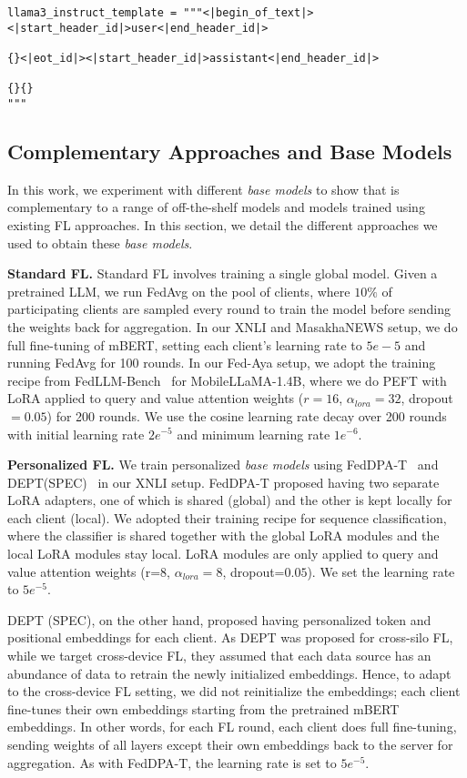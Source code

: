 \begin{lstlisting}[linewidth=\columnwidth,breaklines=true]
llama3_instruct_template = """<|begin_of_text|><|start_header_id|>user<|end_header_id|>

{}<|eot_id|><|start_header_id|>assistant<|end_header_id|>

{}{}
"""
\end{lstlisting}

\subsection{Complementary Approaches and Base Models}

In this work, we experiment with different {\em base models} to show that \method{} is complementary to a range of off-the-shelf models and models trained using existing FL approaches. In this section, we detail the different approaches we used to obtain these {\em base models}.

\noindent\textbf{Standard FL.} Standard FL involves training a single global model. Given a pretrained LLM, we run FedAvg on the \seen{} pool of clients, where $10\%$ of participating clients are sampled every round to train the model before sending the weights back for aggregation. In our XNLI and MasakhaNEWS setup, we do full fine-tuning of mBERT, setting each client's learning rate to $5e-5$ and running FedAvg for 100 rounds. In our Fed-Aya setup, we adopt the training recipe from FedLLM-Bench~\cite{fedllm-bench} for MobileLLaMA-1.4B, where we do PEFT with LoRA applied to query and value attention weights ($r=16$, $\alpha_{lora}=32$, dropout$=0.05$) for 200 rounds. We use the cosine learning rate decay over 200 rounds with initial learning rate $2e^{-5}$ and minimum learning rate $1e^{-6}$.

\noindent\textbf{Personalized FL.} We train personalized {\em base models} using FedDPA-T~\cite{FedDPA} and DEPT(SPEC)~\cite{DEPT} in our XNLI setup. FedDPA-T proposed having two separate LoRA adapters, one of which is shared (global) and the other is kept locally for each client (local). 
We adopted their training recipe for sequence classification, where the classifier is shared together with the global LoRA modules and the local LoRA modules stay local. LoRA modules are only applied to query and value attention weights (r=8, $\alpha_{lora}=8$, dropout=$0.05$). We set the learning rate to $5e^{-5}$.

DEPT (SPEC), on the other hand, proposed having personalized token and positional embeddings for each client. As DEPT was proposed for cross-silo FL, while we target cross-device FL, they assumed that each data source has an abundance of data to retrain the newly initialized embeddings. Hence, to adapt to the cross-device FL setting, we did not reinitialize the embeddings; each client fine-tunes their own embeddings starting from the pretrained mBERT embeddings. In other words, for each FL round, each client does full fine-tuning, sending weights of all layers except their own embeddings back to the server for aggregation. As with FedDPA-T, the learning rate is set to $5e^{-5}$.


